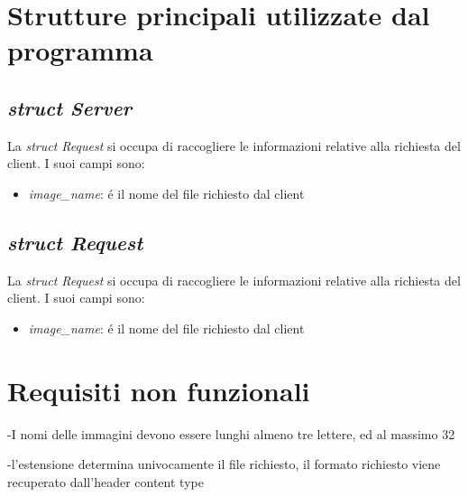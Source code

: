 \documentclass[paper=a4, oneside, fontsize=14pt, titlepage]{article}
\begin{document}
	\section{Strutture principali utilizzate dal programma}
		\subsection{\textit{struct Server}}
	\begin{flushleft}
		La \textit{struct Request} si occupa di raccogliere le informazioni relative alla richiesta del client. I suoi campi sono:
		\begin{itemize}
			\item \textit{image\_name}: \'{e} il nome del file richiesto dal client
		\end{itemize}
	\end{flushleft}
	\subsection{\textit{struct Request}}
	\begin{flushleft}
		La \textit{struct Request} si occupa di raccogliere le informazioni relative alla richiesta del client. I suoi campi sono:
		\begin{itemize}
			\item \textit{image\_name}: \'{e} il nome del file richiesto dal client
		\end{itemize}
	\end{flushleft}
	
	\section{Requisiti non funzionali}
	\begin{flushleft}
		-I nomi delle immagini devono essere lunghi almeno tre lettere, ed al massimo 32

		-l'estensione determina univocamente il file richiesto, il formato richiesto viene recuperato dall'header content type
	\end{flushleft}
	
\end{document}
